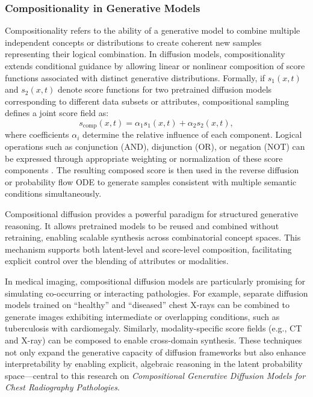 \subsubsection{Compositionality in Generative Models}

Compositionality refers to the ability of a generative model to combine multiple independent concepts or distributions to create coherent new samples representing their logical combination. In diffusion models, compositionality extends conditional guidance by allowing linear or nonlinear composition of score functions associated with distinct generative distributions. Formally, if \( s_1(x, t) \) and \( s_2(x, t) \) denote score functions for two pretrained diffusion models corresponding to different data subsets or attributes, compositional sampling defines a joint score field as:
\begin{equation}
    s_{\text{comp}}(x, t)
    = \alpha_1 s_1(x, t) + \alpha_2 s_2(x, t),
\end{equation}
where coefficients \( \alpha_i \) determine the relative influence of each component. Logical operations such as conjunction (AND), disjunction (OR), or negation (NOT) can be expressed through appropriate weighting or normalization of these score components \cite{liu2023compositionaldiffusion}. The resulting composed score is then used in the reverse diffusion or probability flow ODE to generate samples consistent with multiple semantic conditions simultaneously.

Compositional diffusion provides a powerful paradigm for structured generative reasoning. It allows pretrained models to be reused and combined without retraining, enabling scalable synthesis across combinatorial concept spaces. This mechanism supports both latent-level and score-level composition, facilitating explicit control over the blending of attributes or modalities.  

In medical imaging, compositional diffusion models are particularly promising for simulating co-occurring or interacting pathologies. For example, separate diffusion models trained on “healthy” and “diseased” chest X-rays can be combined to generate images exhibiting intermediate or overlapping conditions, such as tuberculosis with cardiomegaly. Similarly, modality-specific score fields (e.g., CT and X-ray) can be composed to enable cross-domain synthesis. These techniques not only expand the generative capacity of diffusion frameworks but also enhance interpretability by enabling explicit, algebraic reasoning in the latent probability space—central to this research on \textit{Compositional Generative Diffusion Models for Chest Radiography Pathologies}.
